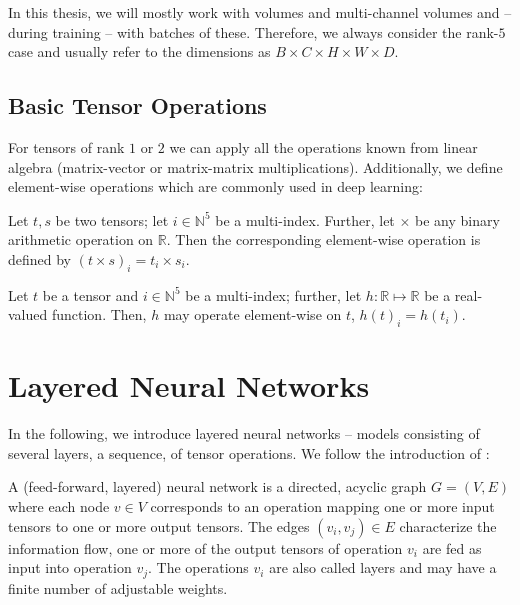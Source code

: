 In this thesis, we will mostly work with volumes and multi-channel volumes
and -- during training -- with batches of these. Therefore, 
we always consider the rank-$5$ case and usually refer to the
dimensions as $B \times C \times H \times W \times D$.

\subsection{Basic Tensor Operations}

For tensors of rank $1$ or $2$ we can apply all the operations known from
linear algebra (\eg matrix-vector or matrix-matrix multiplications). 
Additionally, we define element-wise operations which are commonly
used in deep learning:

\begin{definition}
  Let $t, s$ be two tensors; let $i \in \mathbb{N}^5$ be a multi-index. Further,
  let $\times$ be any binary arithmetic operation on $\mathbb{R}$. Then the corresponding
  element-wise operation is defined by $(t \times s)_{i} = t_{i} \times s_{i}$.
\end{definition}

\begin{definition}
  Let $t$ be a tensor and $i \in \mathbb{N}^5$ be a multi-index; further, let
  $h : \mathbb{R} \mapsto \mathbb{R}$ be a real-valued function.
  Then, $h$ may operate element-wise on $t$, \ie $h(t)_i = h(t_i)$.
\end{definition}

\section{Layered Neural Networks}

In the following, we introduce layered neural networks -- models consisting
of several layers, \ie a sequence, of tensor operations. We follow the 
introduction of \cite[Chapter~6]{GoodfellowBengioCourville:2016}:

\begin{definition}
  \label{def:deep-learning-graph}
  A (feed-forward, layered) neural network is a directed, acyclic graph
  $G = (V, E)$ where each node $v \in V$ corresponds to an operation
  mapping one or more input tensors to one or more output tensors.
  The edges $(v_i, v_j) \in E$ characterize the information flow, \ie one
  or more of the output tensors of operation $v_i$ are fed as input into
  operation $v_j$. The operations
  $v_i$ are also called layers and may have a finite number of adjustable
  weights.
\end{definition}

